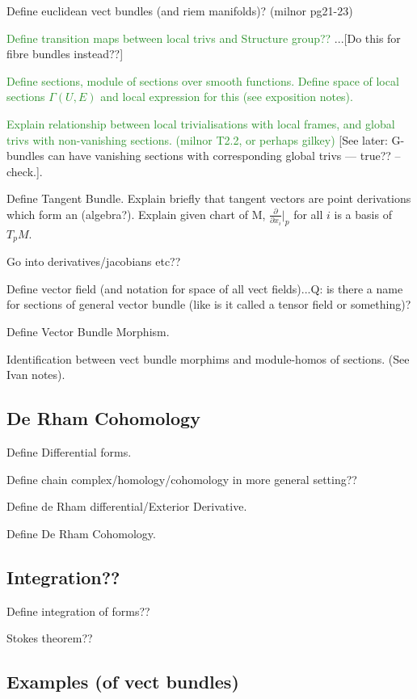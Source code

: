 \documentclass[a4paper]{article}
\theoremstyle{definition} \newtheorem*{definition}{Definition}
\theoremstyle{definition} \newtheorem*{definitions}{Definitions}
\theoremstyle{plain} \newtheorem{theorem}{Theorem}[section]
\theoremstyle{plain} \newtheorem{proposition}[theorem]{Proposition}
\theoremstyle{plain} \newtheorem{corollary}[theorem]{Corollary}
\theoremstyle{plain} \newtheorem{lemma}[theorem]{Lemma}
\theoremstyle{plain} \newtheorem{example}[theorem]{Example}
\newcommand{\done}[1]{\textcolor{ForestGreen}{#1}}
\begin{document}
Define euclidean vect bundles (and riem manifolds)? (milnor pg21-23)

\done{Define transition maps between local trivs and Structure group??} ...[Do this for fibre bundles instead??]

\done{Define sections, module of sections over smooth functions. Define space of local sections $\Gamma (U, E)$ and local expression for this (see exposition notes).}

\done{Explain relationship between local trivialisations with local frames, and global trivs with non-vanishing sections. (milnor T2.2, or perhaps gilkey)}
[See later: G-bundles can have vanishing sections with corresponding global trivs --- true?? --check.]. 

Define Tangent Bundle. 
Explain briefly that tangent vectors are point derivations which form an (algebra?).
Explain given chart of M, $\frac{\partial}{\partial{x_i}} |_p$ for all $i$ is a basis of $T_p M$.

Go into derivatives/jacobians etc??

Define vector field (and notation for space of all vect fields)...Q: is there a name for sections of general vector bundle (like is it called a tensor field or something)?

Define Vector Bundle Morphism.

Identification between vect bundle morphims and module-homos of sections. (See Ivan notes).

\subsection{De Rham Cohomology}

Define Differential forms.

Define chain complex/homology/cohomology in more general setting??

Define de Rham differential/Exterior Derivative.

Define De Rham Cohomology.

\subsection{Integration??}

Define integration of forms??

Stokes theorem??

\subsection{Examples (of vect bundles)}
\end{document}
